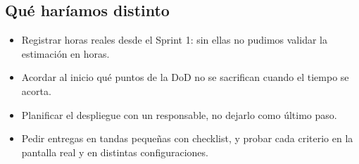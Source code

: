 \documentclass[11pt,a4paper]{article}
\begin{document}
\subsection{Qué haríamos distinto}
\begin{itemize}
  \item Registrar horas reales desde el Sprint 1: sin ellas no pudimos validar la estimación en horas.
  \item Acordar al inicio qué puntos de la DoD no se sacrifican cuando el tiempo se acorta.
  \item Planificar el despliegue con un responsable, no dejarlo como último paso.
  \item Pedir entregas en tandas pequeñas con checklist, y probar cada criterio en la pantalla real y en distintas configuraciones.
\end{itemize}
\end{document}
